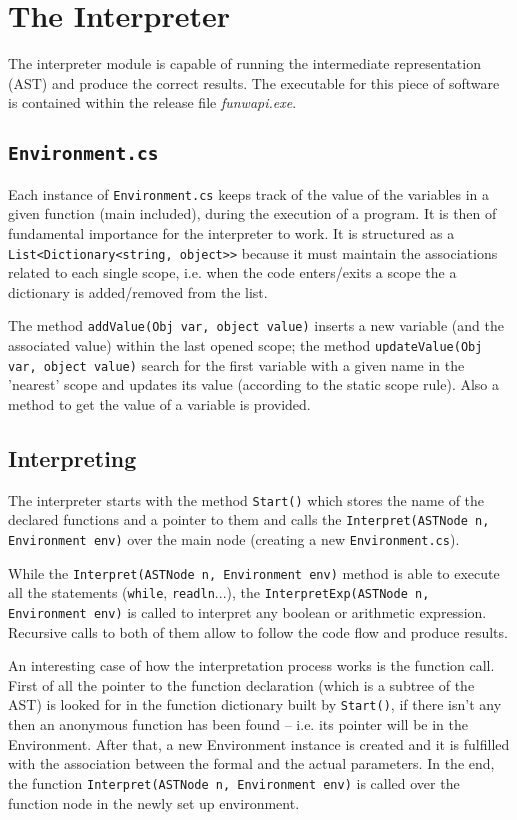 \chapter{\label{chapter4} The \fwap Interpreter}

The interpreter module is capable of running the \fwap intermediate representation (AST) and produce the correct results. The executable for this piece of software is contained within the release file \textit{funwapi.exe}. 

\section{\texttt{Environment.cs}}

Each instance of \texttt{Environment.cs} keeps track of the value of the variables in a given function (main included), during the execution of a program. It is then of fundamental importance for the interpreter to work. It is structured as a \texttt{List<Dictionary<string, object>>} because it must maintain the associations related to each single scope, i.e. when the code enters/exits a scope the a dictionary is added/removed from the list.

The method \texttt{addValue(Obj var, object value)} inserts a new variable (and the associated value) within the last opened scope; the method \texttt{updateValue(Obj var, object value)} search for the first variable with a given name in the 'nearest' scope and updates its value (according to the static scope rule). Also a method to get the value of a variable is provided.

\section{Interpreting \fwap}

The interpreter starts with the method \texttt{Start()} which stores the name of the declared functions and a pointer to them and calls the \texttt{Interpret(ASTNode n, Environment env)} over the main node (creating a new \texttt{Environment.cs}). 

While the \texttt{Interpret(ASTNode n, Environment env)} method is able to execute all the statements (\texttt{while}, \texttt{readln}...), the \texttt{InterpretExp(ASTNode n, Environment env)} is called to interpret any boolean or arithmetic expression. Recursive calls to both of them allow to follow the code flow and produce results.

An interesting case of how the interpretation process works is the function call. First of all the pointer to the function declaration (which is a subtree of the AST) is looked for in the function dictionary built by \texttt{Start()}, if there isn't any then an anonymous function has been found -- i.e. its pointer will be in the Environment. After that, a new Environment instance is created and it is fulfilled with the association between the formal and the actual parameters. In the end, the function \texttt{Interpret(ASTNode n, Environment env)} is called over the function node in the newly set up environment.
